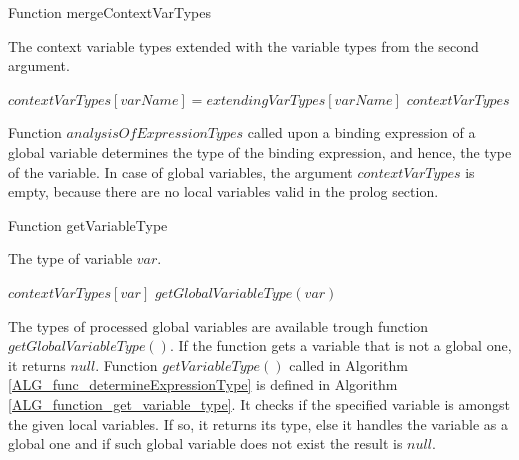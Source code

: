 

\begin{algorithm}
\caption{Function mergeContextVarTypes}
\label{ALG_function_mergeContextVarTypes}
\begin{algorithmic}[1]
\ENSURE The context variable types extended with the variable types from the second argument.

    \STATE $contextVarTypes[varName] = extendingVarTypes[varName]$
\ENDFOR
\RETURN $contextVarTypes$
\end{algorithmic}
\end{algorithm}

Function $analysisOfExpressionTypes$ called upon a binding expression of a global variable determines the type of the binding expression, and hence, the type of the variable. In case of global variables, the argument $contextVarTypes$ is empty, because there are no local variables valid in the prolog section.

\begin{algorithm}
\caption{Function getVariableType}
\label{ALG_function_get_variable_type}
\begin{algorithmic}[1]
\ENSURE The type of variable $var$.

     \RETURN $contextVarTypes[var]$
\ELSE
     \RETURN $getGlobalVariableType(var)$
\ENDIF
\end{algorithmic}
\end{algorithm}

The types of processed global variables are available trough function \linebreak $getGlobalVariableType()$. If the function gets a variable that is not a global one, it returns $null$. Function $getVariableType()$ called in Algorithm \ref{ALG_func_determineExpressionType} is defined in Algorithm \ref{ALG_function_get_variable_type}. It checks if the specified variable is amongst the given local variables. If so, it returns its type, else it handles the variable as a global one and if such global variable does not exist the result is $null$.

